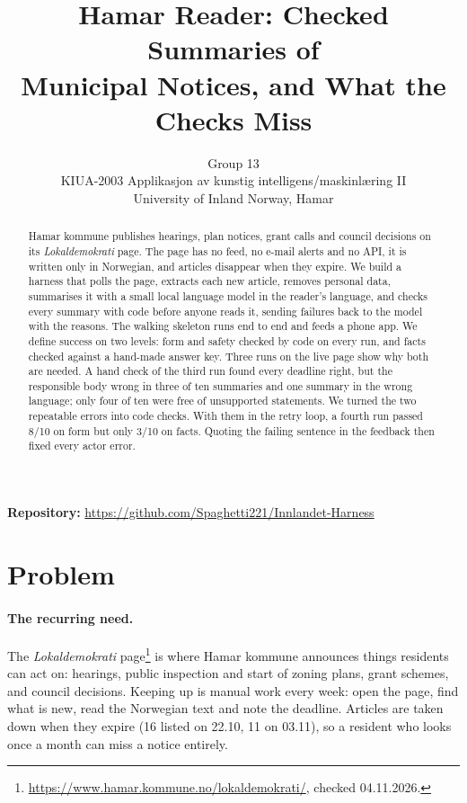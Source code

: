 \documentclass{article}
\title{Hamar Reader: Checked Summaries of\\ Municipal Notices, and What the Checks Miss}
\author{%
  Group 13\\
  KIUA-2003 Applikasjon av kunstig intelligens/maskinlæring II\\
  University of Inland Norway, Hamar\\
}
\begin{document}
\maketitle

\begin{abstract}
Hamar kommune publishes hearings, plan notices, grant calls and council decisions on its
\emph{Lokaldemokrati} page. The page has no feed, no e-mail alerts and no API, it is written only in
Norwegian, and articles disappear when they expire. We build a harness that polls the page, extracts
each new article, removes personal data, summarises it with a small local language model in the
reader's language, and checks every summary with code before anyone reads it, sending failures back
to the model with the reasons. The walking skeleton runs end to end and feeds a phone app. We define
success on two levels: form and safety checked by code on every run, and facts checked against a
hand-made answer key. Three runs on the live page show why both are needed. A hand check of the
third run found every deadline right, but the responsible body wrong in three of ten summaries and
one summary in the wrong language; only four of ten were free of unsupported statements. We turned
the two repeatable errors into code checks. With them in the retry loop, a fourth run passed 8/10 on
form but only 3/10 on facts. Quoting the failing sentence in the feedback then fixed every actor error.
\end{abstract}

\noindent\textbf{Repository:} \url{https://github.com/Spaghetti221/Innlandet-Harness}

\section{Problem}

\paragraph{The recurring need.} The \emph{Lokaldemokrati} page\footnote{\url{https://www.hamar.kommune.no/lokaldemokrati/}, checked 04.11.2026.}
is where Hamar kommune announces things residents can act on: hearings, public inspection and start
of zoning plans, grant schemes, and council decisions. Keeping up is manual work every week: open the
page, find what is new, read the Norwegian text and note the deadline. Articles are taken down when
they expire (16 listed on 22.10, 11 on 03.11), so a resident who looks once a month can miss a notice
entirely.
\end{document}

